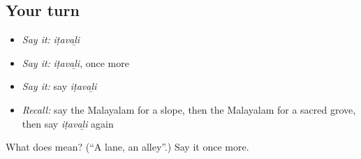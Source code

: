 \subsection*{Your turn}
\begin{itemize}
\raggedright
  \item \emph{Say it:} \emph{iṭavaḻi}
  \item \emph{Say it:} \emph{iṭavaḻi}, once more
  \item \emph{Say it:} say \emph{iṭavaḻi}
  \item \emph{Recall:} say the Malayalam for a slope, then the Malayalam for a sacred grove, then say \emph{iṭavaḻi} again
\end{itemize}

\begin{tcolorbox}[breakable,colback=teal!4,colframe=teal!35!black,title={Before you move on}]
What does  mean? (\textquotedblleft{}A lane, an alley\textquotedblright{}.) Say it once more.
\end{tcolorbox}
